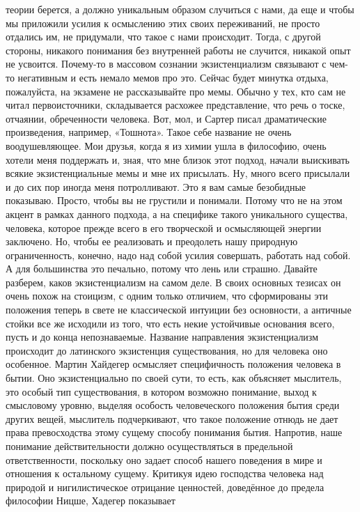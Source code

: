теории берется, а должно уникальным образом случиться с нами, да еще и чтобы мы
приложили усилия к осмыслению этих своих переживаний, не просто отдались им, не
придумали, что такое с нами происходит. Тогда, с другой стороны, никакого
понимания без внутренней работы не случится, никакой опыт не усвоится. Почему-то
в массовом сознании экзистенциализм связывают с чем-то негативным и есть немало
мемов про это. Сейчас будет минутка отдыха, пожалуйста, на экзамене не
рассказывайте про мемы. Обычно у тех, кто сам не читал первоисточники,
складывается расхожее представление, что речь о тоске, отчаянии, обреченности
человека. Вот, мол, и Сартер писал драматические произведения, например,
«Тошнота». Такое себе название не очень воодушевляющее. Мои друзья, когда я из
химии ушла в философию, очень хотели меня поддержать и, зная, что мне близок
этот подход, начали выискивать всякие экзистенциальные мемы и мне их присылать.
Ну, много всего присылали и до сих пор иногда меня потролливают. Это я вам самые
безобидные показываю. Просто, чтобы вы не грустили и понимали. Потому что не на
этом акцент в рамках данного подхода, а на специфике такого уникального
существа, человека, которое прежде всего в его творческой и осмысляющей энергии
заключено. Но, чтобы ее реализовать и преодолеть нашу природную ограниченность,
конечно, надо над собой усилия совершать, работать над собой. А для большинства
это печально, потому что лень или страшно. Давайте разберем, каков
экзистенциализм на самом деле. В своих основных тезисах он очень похож на
стоицизм, с одним только отличием, что сформированы эти положения теперь в свете
не классической интуиции без основности, а античные стойки все же исходили из
того, что есть некие устойчивые основания всего, пусть и до конца непознаваемые.
Название направления экзистенциализм происходит до латинского экзистенция
существования, но для человека оно особенное. Мартин Хайдегер осмысляет
специфичность положения человека в бытии. Оно экзистенциально по своей сути, то
есть, как объясняет мыслитель, это особый тип существования, в котором возможно
понимание, выход к смысловому уровню, выделяя особость человеческого положения
бытия среди других вещей, мыслитель подчеркивают, что такое положение отнюдь не
дает права превосходства этому сущему способу понимания бытия. Напротив, наше
понимание действительности должно осуществляться в предельной ответственности,
поскольку оно задает способ нашего поведения в мире и отношения к остальному
сущему. Критикуя идею господства человека над природой и нигилистическое
отрицание ценностей, доведённое до предела философии Ницше, Хадегер показывает
